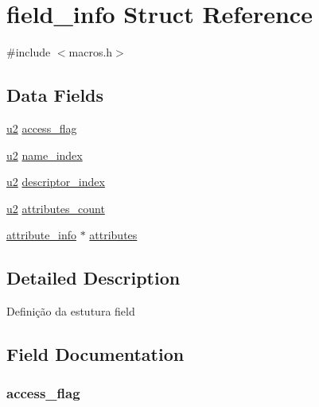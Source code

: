 \hypertarget{structfield__info}{}\section{field\+\_\+info Struct Reference}
\label{structfield__info}


{\ttfamily \#include $<$macros.\+h$>$}

\subsection*{Data Fields}
\begin{DoxyCompactItemize}
\item 
\hyperlink{macros_8h_a732cde1300aafb73b0ea6c2558a7a54f}{u2} \hyperlink{structfield__info_aff4cdf43eddac4ac32db6433067abfd2}{access\+\_\+flag}
\item 
\hyperlink{macros_8h_a732cde1300aafb73b0ea6c2558a7a54f}{u2} \hyperlink{structfield__info_ae939ac3ca00f5727beaa02d0e339183d}{name\+\_\+index}
\item 
\hyperlink{macros_8h_a732cde1300aafb73b0ea6c2558a7a54f}{u2} \hyperlink{structfield__info_a3f13794b6c8b4ffc87b87a7c01a69060}{descriptor\+\_\+index}
\item 
\hyperlink{macros_8h_a732cde1300aafb73b0ea6c2558a7a54f}{u2} \hyperlink{structfield__info_aa53122439ee827a418258d52c51368c6}{attributes\+\_\+count}
\item 
\hyperlink{macros_8h_a6e3cdeb6f8c542bea1decdee365bffbb}{attribute\+\_\+info} $\ast$ \hyperlink{structfield__info_aae221e548ab4ef529cd1a0f2fcdabb9b}{attributes}
\end{DoxyCompactItemize}


\subsection{Detailed Description}
Definição da estutura field 

\subsection{Field Documentation}
\hypertarget{structfield__info_aff4cdf43eddac4ac32db6433067abfd2}{}
\subsubsection[{access\+\_\+flag}]{ access\+\_\+flag}\label{structfield__info_aff4cdf43eddac4ac32db6433067abfd2}
\hypertarget{structfield__info_aae221e548ab4ef529cd1a0f2fcdabb9b}{}
